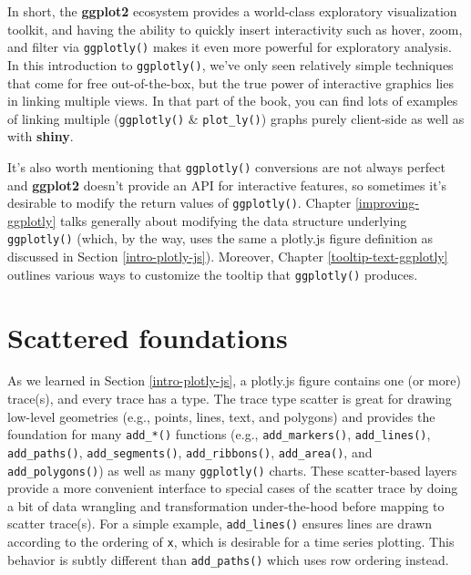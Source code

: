 \documentclass[
  12pt,
]{krantz}
\begin{document}
In short, the \textbf{ggplot2} ecosystem provides a world-class exploratory visualization toolkit, and having the ability to quickly insert interactivity such as hover, zoom, and filter via \texttt{ggplotly()} makes it even more powerful for exploratory analysis. In this introduction to \texttt{ggplotly()}, we've only seen relatively simple techniques that come for free out-of-the-box, but the true power of interactive graphics lies in linking multiple views. In that part of the book, you can find lots of examples of linking multiple (\texttt{ggplotly()} \& \texttt{plot\_ly()}) graphs purely client-side as well as with \textbf{shiny}.

It's also worth mentioning that \texttt{ggplotly()} conversions are not always perfect and \textbf{ggplot2} doesn't provide an API for interactive features, so sometimes it's desirable to modify the return values of \texttt{ggplotly()}. Chapter \ref{improving-ggplotly} talks generally about modifying the data structure underlying \texttt{ggplotly()} (which, by the way, uses the same a plotly.js figure definition as discussed in Section \ref{intro-plotly-js}). Moreover, Chapter \ref{tooltip-text-ggplotly} outlines various ways to customize the tooltip that \texttt{ggplotly()} produces.

\hypertarget{scatter-traces}{%
\chapter{Scattered foundations}\label{scatter-traces}}


As we learned in Section \ref{intro-plotly-js}, a plotly.js figure contains one (or more) trace(s), and every trace has a type. The trace type scatter is great for drawing low-level geometries (e.g., points, lines, text, and polygons) and provides the foundation for many \texttt{add\_*()} functions (e.g., \texttt{add\_markers()}, \texttt{add\_lines()}, \texttt{add\_paths()}, \texttt{add\_segments()}, \texttt{add\_ribbons()}, \texttt{add\_area()}, and \texttt{add\_polygons()}) as well as many \texttt{ggplotly()} charts. These scatter-based layers provide a more convenient interface to special cases of the scatter trace by doing a bit of data wrangling and transformation under-the-hood before mapping to scatter trace(s). For a simple example, \texttt{add\_lines()} ensures lines are drawn according to the ordering of \texttt{x}, which is desirable for a time series plotting. This behavior is subtly different than \texttt{add\_paths()} which uses row ordering instead.
\end{document}
